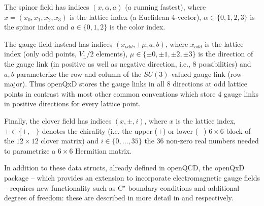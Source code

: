 The spinor field has indices $(x, \alpha, a)$ ($a$ running fastest), where $x=(x_0,x_1,x_2,x_3)$ is the lattice index (a Euclidean 4-vector), $\alpha \in \{0,1,2,3\}$ is the spinor index and $a \in \{0,1,2\}$ is the color index.

The gauge field instead has indices $(x_{odd}, \pm \mu, a, b)$, where $x_{odd}$ is the lattice index (only odd points, $V_\mathrm{L}/2$ elements), $\mu \in \{\pm 0, \pm 1, \pm 2, \pm 3\}$ is the direction of the gauge link (in positive as well as negative direction, i.e., 8 possibilities) and $a,b$ parameterize the row and column of the $SU(3)$-valued gauge link (row-major). Thus openQxD stores the gauge links in all $8$ directions at odd lattice points in contrast with most other common conventions which store $4$ gauge links in positive directions for every lattice point.

Finally, the clover field has indices $(x, \pm, i)$, where $x$ is the lattice index, $\pm \in \{+, -\}$ denotes the chirality (i.e. the upper ($+$) or lower ($-$) $6 \times 6$-block of the $12 \times 12$ clover matrix) and $i \in \{0, \dots, 35\}$ the $36$ non-zero real numbers needed to parametrize a $6 \times 6$ Hermitian matrix.

In addition to these data structs, already defined in openQCD, the openQxD package --
which provides an extension to incorporate electromagnetic gauge fields --
requires new functionality such as C$^\star$ boundary conditions
and additional degrees of freedom: these are described in more detail in
 and respectively.

